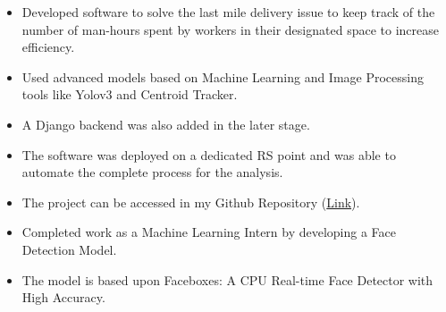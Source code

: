 \documentclass[10pt,a4paper,ragged2e]{altacv}
\begin{document}

\begin{fullwidth}
\makecvheader
\end{fullwidth}



\begin{itemize}
    \item Developed software to solve the last mile delivery issue to keep track of the number of man-hours spent by workers in their designated space to increase efficiency.
    \item Used advanced models based on Machine Learning and Image Processing tools like Yolov3 and Centroid Tracker.
    \item A Django backend was also added in the later stage.
    \item The software was deployed on a dedicated RS point and was able to automate the complete process for the analysis.
    \item The project can be accessed in my Github Repository (\href{https://github.com/strider187/People_Count_HUL}{Link}).
    \end{itemize}
    \divider\newline
{}
\begin{itemize}
    \item Completed work as a Machine Learning Intern by developing a Face Detection Model.
    \item The model is based upon Faceboxes: A CPU Real-time Face Detector with High Accuracy.
\end{itemize}
\end{document}
